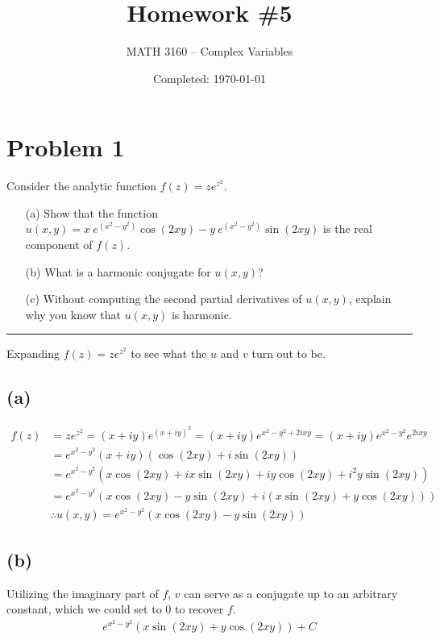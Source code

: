 \documentclass{article}
\title{Homework \#5}
\author{
	MATH 3160 -- Complex Variables\\
	\myauthor
}
\date{Completed: \today}
\let\oldcos\cos
\let\oldsin\sin
\renewcommand{\cos}[1]{\oldcos\left(#1\right)}
\renewcommand{\sin}[1]{\oldsin\left(#1\right)}
\begin{document}
\maketitle %


\section*{Problem 1}
Consider the analytic function $f(z) = z e^{z^2}$.
\begin{enumerate}
	\item [(a)] Show that the function $u(x,y) = x \ e^{(x^2 - y^2)} \cos{2xy} - y \ e^{(x^2 - y^2)} \sin{2xy}$ is the real component of $f(z)$.
	\item [(b)] What is a harmonic conjugate for $u(x,y)$?
	\item [(c)] Without computing the second partial derivatives of $u(x,y)$, explain why you know that $u(x,y)$ is harmonic.
\end{enumerate}

\vspace{.5cm} %

\hrule %
Expanding $f(z) = z e^{z^2}$ to see what the $u$ and $v$ turn out to be.
\subsection*{(a)}
\begin{align*}
  f(z) &= z e^{z^2} = (x+iy)e^{(x+iy)^2} = (x+iy)e^{x^2-y^2+2ixy} = (x+iy)e^{x^2-y^2}e^{2ixy}\\
  &= e^{x^2-y^2}(x+iy)(\cos{2xy}+i\sin{2xy}) \\
       &= e^{x^2-y^2}(x\cos{2xy}+ix\sin{2xy} + iy\cos{2xy}+i^2y\sin{2xy})\\
       &=  e^{x^2-y^2}(x\cos{2xy}-y\sin{2xy} + i(x\sin{2xy} + y\cos{2xy}))\\
       &\therefore u(x,y) = e^{x^2-y^2}(x\cos{2xy}-y\sin{2xy})
\end{align*}
\subsection{(b)}
Utilizing the imaginary part of $f$, $v$ can serve as a conjugate up to an arbitrary constant, which we could set to 0 to recover $f$. 
\begin{align*}
e^{x^2-y^2} (x\sin{2xy} + y\cos{2xy}) + C
\end{align*}
\end{document}
